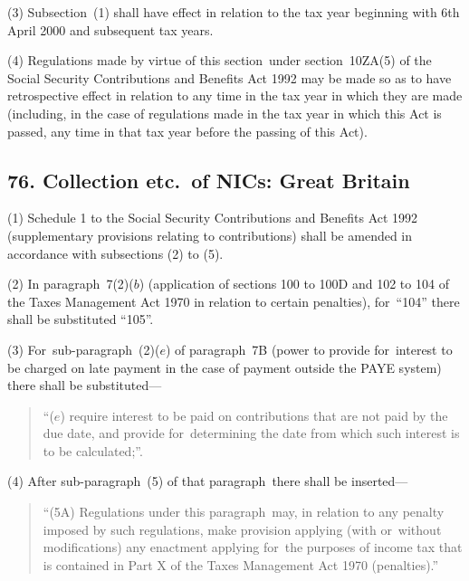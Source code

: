 \documentclass[12pt,a4paper]{article}
\begin{document}

(3) Subsection~(1)  shall have effect in relation to the tax year beginning with 6th April 2000 and subsequent tax years.

(4) Regulations made by virtue of this section~under section~10ZA(5)  of the Social Security Contributions and Benefits Act 1992 may be made so as to have retrospective effect in relation to any time in the tax year in which they are made (including, in the case of regulations made in the tax year in which this Act is passed, any time in that tax year before the passing of this Act).


\subsection{76. Collection etc.\ of NICs: Great Britain}

(1) Schedule 1 to the Social Security Contributions and Benefits Act 1992 (supplementary provisions relating to contributions) shall be amended in accordance with subsections (2)  to (5).

(2) In paragraph~7(2)($b$)  (application of sections 100 to 100D and 102 to 104 of the Taxes Management Act 1970 in relation to certain penalties), for~“104” there shall be substituted “105”.

(3) For~sub-paragraph~(2)($e$)  of paragraph~7B (power to provide for~interest to be charged on late payment in the case of payment outside the PAYE system) there shall be substituted—
\begin{quotation}
“($e$) require interest to be paid on contributions that are not paid by the due date, and provide for~determining the date from which such interest is to be calculated;”.
\end{quotation}

(4) After sub-paragraph~(5)  of that paragraph~there shall be inserted—
\begin{quotation}
“(5A) Regulations under this paragraph~may, in relation to any penalty imposed by such regulations, make provision applying (with or~without modifications) any enactment applying for~the purposes of income tax that is contained in Part X of the Taxes Management Act 1970 (penalties).”
\end{quotation}
\end{document}
